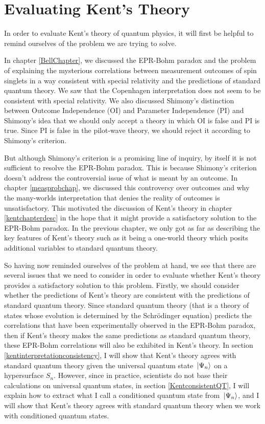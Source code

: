 
\chapter{Evaluating Kent's Theory\label{KentEval}}
In order to evaluate Kent's theory of quantum physics, it will first be helpful to remind ourselves of the problem we are trying to solve. 

In chapter \ref{BellChapter}, we discussed the EPR-Bohm paradox and the problem of explaining  the mysterious correlations between measurement outcomes of spin singlets in a way consistent with special relativity and the predictions of standard quantum theory. We saw that the Copenhagen interpretation does not seem to be consistent with special relativity. We also discussed Shimony's distinction between Outcome Independence (OI) and Parameter Independence (PI) and Shimony's idea that we should only accept a theory in which OI is false and PI is true. Since PI is false in the pilot-wave theory, we should reject it according to Shimony's criterion.  

But although Shimony's criterion is a promising line of inquiry, by itself it is not sufficient to resolve the  EPR-Bohm paradox. This is because Shimony's criterion doesn't address the controversial issue of what is meant by an outcome. In chapter \ref{measprobchap}, we discussed this controversy over outcomes and why the many-worlds interpretation that denies the reality of outcomes is unsatisfactory. This motivated the discussion of Kent's theory in chapter \ref{kentchapterdesc} in the hope that it might provide a satisfactory solution to the EPR-Bohm paradox. In the previous chapter, we only got as far as describing the key features of Kent's theory such as it being a one-world theory which posits additional variables to standard quantum theory. 

So having now reminded ourselves of the problem at hand, we see that there are several issues that we need to consider in order to evaluate whether Kent's theory provides a satisfactory solution to this problem. Firstly, we should consider whether the predictions of Kent's theory are consistent with the  predictions of standard quantum theory. Since standard quantum theory (that is a theory of states whose evolution is determined by the Schr\"{o}dinger equation) predicts the correlations that have been experimentally observed in the EPR-Bohm paradox, then if Kent's theory makes the same predictions as standard quantum theory, these EPR-Bohm correlations will also be exhibited in Kent's theory.  In section \ref{kentinterpretationconsistency}, I will show that Kent's theory agrees with standard quantum theory given the universal quantum state $\ket*{\Psi_n}$ on a hypersurface $S_n$. However, since in practice, scientists do not base their calculations on universal quantum states, in section \ref{KentconsistentQT}, I will explain how to extract what I call a conditioned quantum state from $\ket*{\Psi_n}$, and I will show that  Kent's theory agrees with standard quantum theory when we work with conditioned quantum states.

